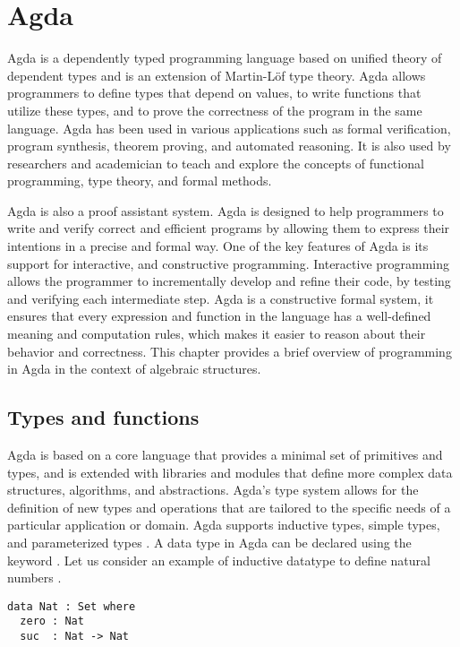 \chapter{Agda}
Agda is a dependently typed programming language based on unified theory of
dependent types and is an extension of Martin-Löf type theory. Agda allows
programmers to define types that depend on values, to write functions that
utilize these types, and to prove the correctness of the program in the same
language. Agda has been used in various applications such as formal
verification, program synthesis, theorem proving, and automated reasoning. It is
also used by researchers and academician to teach and explore the concepts of
functional programming, type theory, and formal methods.

Agda is also a proof assistant system. Agda is designed to help programmers to
write and verify correct and efficient programs by allowing them to express
their intentions in a precise and formal way. One of the key features of Agda is
its support for interactive, and constructive programming. Interactive
programming allows the programmer to incrementally develop and refine their
code, by testing and verifying each intermediate step. Agda is a constructive
formal system, it ensures that every expression and function in the language has
a well-defined meaning and computation rules, which makes it easier to reason
about their behavior and correctness. This chapter provides a brief overview of
programming in Agda in the context of algebraic structures. 

\section{Types and functions}
\label{types}
Agda is based on a core language that provides a minimal set of primitives and
types, and is extended with libraries and modules that define more complex data
structures, algorithms, and abstractions. Agda's type system allows for the
definition of new types and operations that are tailored to the specific needs
of a particular application or domain. Agda supports inductive types, simple
types, and parameterized types \cite{10.1007/978-3-642-03359-9_6}. A data type
in Agda can be declared using the keyword . Let us consider an
example of inductive datatype to define natural numbers .

\label{code:Nat}
\begin{verbatim}
data Nat : Set where
  zero : Nat
  suc  : Nat -> Nat
\end{verbatim}

